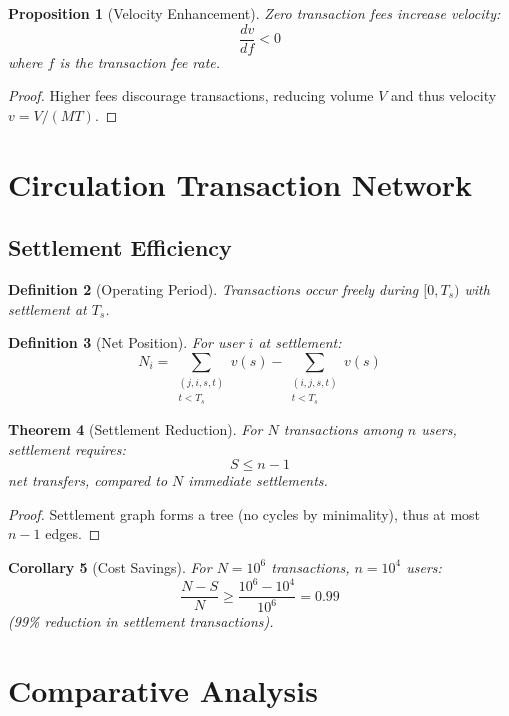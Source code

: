 \documentclass[12pt]{article}
\newtheorem{theorem}{Theorem}
\newtheorem{definition}[theorem]{Definition}
\newtheorem{proposition}[theorem]{Proposition}
\newtheorem{corollary}[theorem]{Corollary}
\begin{document}
\begin{proposition}[Velocity Enhancement]
Zero transaction fees increase velocity:
$$
\frac{dv}{df} < 0
$$
where $f$ is the transaction fee rate.
\end{proposition}

\begin{proof}
Higher fees discourage transactions, reducing volume $V$ and thus velocity $v = V/(MT)$.
\end{proof}

\section{Circulation Transaction Network}

\subsection{Settlement Efficiency}

\begin{definition}[Operating Period]
Transactions occur freely during $[0, T_s)$ with settlement at $T_s$.
\end{definition}

\begin{definition}[Net Position]
For user $i$ at settlement:
$$
N_i = \sum_{\substack{(j,i,s,t) \\ t < T_s}} v(s) - \sum_{\substack{(i,j,s,t) \\ t < T_s}} v(s)
$$
\end{definition}

\begin{theorem}[Settlement Reduction]
For $N$ transactions among $n$ users, settlement requires:
$$
S \leq n - 1
$$
net transfers, compared to $N$ immediate settlements.
\end{theorem}

\begin{proof}
Settlement graph forms a tree (no cycles by minimality), thus at most $n-1$ edges.
\end{proof}

\begin{corollary}[Cost Savings]
For $N = 10^6$ transactions, $n = 10^4$ users:
$$
\frac{N - S}{N} \geq \frac{10^6 - 10^4}{10^6} = 0.99
$$
(99\% reduction in settlement transactions).
\end{corollary}

\section{Comparative Analysis}
\end{document}

